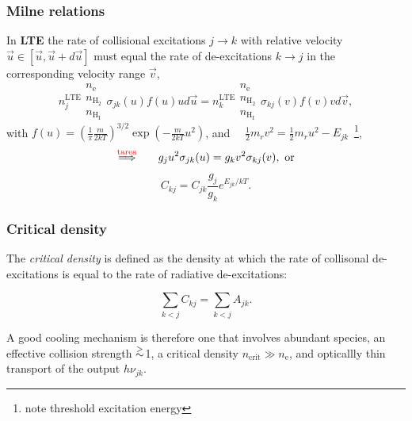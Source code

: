 \begin{frame}

\end{frame} \begin{frame}\frametitle{Milne relations}

In {\bf LTE} the rate of collisional excitations $j\rightarrow k$ with
relative velocity $\vec{u} \in [\vec{u},\vec{u}+d\vec{u}]$ must equal
the rate of de-excitations $k \rightarrow j$ in the corresponding
velocity range $\vec{v}$, \[
n^\mathrm{LTE}_j \begin{array}{c}  n_\mathrm{e} \\  n_\mathrm{H_2} \\  n_\mathrm{H_I} \end{array}  \sigma_{jk}(u) f(u)  u d\vec{u}  = 
n^\mathrm{LTE}_k \begin{array}{c}  n_\mathrm{e} \\  n_\mathrm{H_2} \\
n_\mathrm{H_I} \end{array}  \sigma_{kj}(v) f(v)  v d\vec{v}  , \]
with   $ f(u) =   \left(\frac{1}{\pi}\frac{m}{2kT} \right)^{3/2}
\exp\left(-\frac{m}{2kT} u^2 \right) $,  and~~ $ \frac{1}{2}m_r v^2 =
\frac{1}{2} m_r u^2 - E_{jk}$~\footnote{note threshold excitation energy},  
\[\stackrel{\textcolor{red}{\mathrm{tarea}}} \Longrightarrow  ~~~~~  g_j u^2 \sigma_{jk}(u) = g_k v^2 \sigma_{kj}(v),~\text{or} \]
\[ C_{kj}=C_{jk} \frac{g_{j}}{g_{k}} e^{E_{jk}/kT} .\] 



\end{frame} \begin{frame}\frametitle{Critical density}

The {\em critical density} is defined as the density at which the rate
of collisonal de-excitations is equal to the rate of radiative
de-excitations:

\[\sum_{k<j} C_{kj} = \sum_{k<j} A_{jk} .\]

A good cooling mechanism is therefore one that involves abundant
species, an effective collision strength $\stackrel{>}{\small \sim}$1, a critical density
$n_\mathrm{crit} \gg n_\mathrm{e}$, and opticallly thin transport of
the output $h \nu_{jk}$.



\end{frame}
